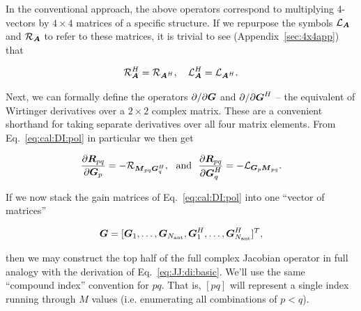 \documentclass[useAMS,usenatbib]{mn2e}
\newcommand{\mat}[1]{{\bmath{#1}}}
\newcommand{\MM}{\mat{M}}
\newcommand{\RR}{\mat{R}}
\newcommand{\GG}{\mat{G}}
\begin{document}
In the conventional approach, the above operators correspond to multiplying 4-vectors by $4\times4$ matrices of a
specific structure. If we repurpose the symbols $\Lop{\mat{A}}$ and $\Rop{\mat{A}}$ to refer to these matrices, 
it is trivial to see (Appendix~\ref{sec:4x4app}) that 

\begin{equation}
\label{eq:RH:LH}
\Rop{\mat{A}}^H = \Rop{\mat{A}^H},~~~\Lop{\mat{A}}^H = \Lop{\mat{A}^H}.
\end{equation}


Next, we can formally define the operators $\partial/\partial\GG$ and $\partial/\partial\GG^H$ -- the equivalent of 
Wirtinger derivatives over a $2\times2$ complex matrix. These are a convenient shorthand for taking separate 
derivatives over all four matrix elements. From Eq.~\ref{eq:cal:DI:pol} in particular
we then get


\begin{equation}
\label{eq:dR:dG}
\frac{\partial\RR_{pq}}{\partial\GG_p} = -\Rop{\MM_{pq}\GG^H_q},\mathrm{~~and~~}
\frac{\partial\RR_{pq}}{\partial\GG^H_q} = -\Lop{\GG_p \MM_{pq}}.
\end{equation}

If we now stack the gain matrices of Eq.~\ref{eq:cal:DI:pol} into one ``vector of matrices'' 

\begin{equation}
\label{eq:GGvec}
\GG = [ \GG_1,\dots,\GG_{\scriptstyle \Na},\GG^H_1,\dots,\GG^H_{\scriptstyle \Na} ]^T,
\end{equation}

then we may construct the top half of the full complex Jacobian operator in full analogy with the 
derivation of Eq.~\ref{eq:JJ:di:basic}. We'll use the same ``compound index'' convention for $pq$. That is, 
$[pq]$ will represent a single index running through $M$ values (i.e. enumerating all combinations of $p<q$).
\end{document}
